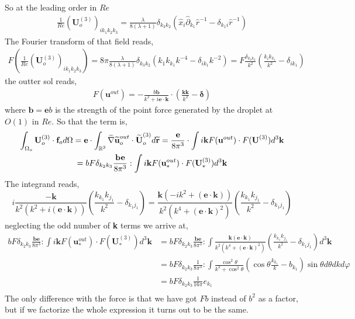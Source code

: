 So at the leading order in $Re$
\begin{align*}
    \frac{1}{Re}(\textbf{U}^{(3)}_o)_{ik_1k_2k_3}
    =
    \frac{\lambda}{8(\lambda+1)} \delta_{k_3 k_2 } ( \hat{x}_i\hat{\partial}_{k_1} \hat{r}^{-1}
    - \delta_{k_1 i} \hat{r}^{-1})
\end{align*}
The Fourier transform of that field reads,
\begin{align}
    F(\frac{1}{Re}(\textbf{U}^{(3)}_o)_{ik_1k_2k_3}) =
    8\pi \frac{\lambda}{8(\lambda+1)} \delta_{k_3 k_2 } (
        k_1 k_{k_1} k^{-4}
        - \delta_{i k_1} k^{-2}
    )
    =
    F\frac{\delta_{k_3k_2}}{k^2}\left(
        \frac{k_ik_{k_1}}{k^2}
        -\delta_{ik_1}
    \right)
\end{align}
the outter sol reads, 
\begin{align}
    F(\textbf{u}^{out})
    = 
    -\frac{b\textbf{b}}{k^2  + i \textbf{e}\cdot \textbf{k}}\cdot (\frac{\textbf{kk}}{k^2} - \bm\delta)
\end{align}
where $\textbf{b} = \textbf{e}b$ is the strength of the point force generated by the droplet at $O(1)$ in $Re$.
So that the term is,
\begin{multline}
    \intO[o]{\textbf{U}_{o}^{(3)}\cdot \textbf{f}_{o}}
    =
    \textbf{e}\cdot 
    \int_{\mathbb{R}^3}  \widetilde{\grad}  \widetilde{\textbf{u}}_{o}^{out}\cdot \widetilde{\textbf{U}}_{o}^{(3)} d\widetilde{\textbf{r}}
    =
    \frac{\textbf{e}}{8\pi^3}\cdot \int
    i \textbf{k} F(\textbf{u}^{out}) \cdot F(\textbf{U}^{(3)}) d^3 \textbf{k}\\
    =
    b F \delta_{k_2k_3}\frac{\textbf{be}}{8\pi^3} : \int
    i \textbf{k} F(\textbf{u}^{out}_*) \cdot F(\textbf{U}^{(3)}_*) d^3 \textbf{k}
\end{multline}
The integrand reads, 
\begin{equation*}
    i \frac{- \textbf{k}}{k^2(k^2  + i (\textbf{e}\cdot \textbf{k}))} (\frac{k_{k_1}k_{j_1}}{k^2} - \delta_{k_1j_1})   
    =
    \frac{ \textbf{k}(-ik^2  + (\textbf{e}\cdot \textbf{k}))}{k^2(k^4  + (\textbf{e}\cdot \textbf{k})^2)} (\frac{k_{k_1}k_{j_1}}{k^2} - \delta_{k_1j_1})   
\end{equation*}
neglecting the odd number of \textbf{k} terms we arrive at, 
\begin{align}
    b F \delta_{k_2k_3}\frac{\textbf{be}}{8\pi^3} : \int
    i \textbf{k} F(\textbf{u}^{out}_*) \cdot F(\textbf{U}^{(3)}_*) d^3 \textbf{k}
    &=
    b F \delta_{k_2k_3}\frac{\textbf{be}}{8\pi^3} : 
    \int
    \frac{ \textbf{k} (\textbf{e}\cdot \textbf{k})}{k^2(k^4  + (\textbf{e}\cdot \textbf{k})^2)} (\frac{k_{k_1}k_{j_1}}{k^2} - \delta_{k_1j_1})  d^3 \textbf{k}\\
    &=
    b F \delta_{k_2k_3}\frac{1}{8\pi^3} : 
    \int
    \frac{ \cos^2\theta }{k^2  +  \cos^2\theta} (\cos\theta\frac{k_{k_1}}{k} - b_{k_1})  \sin\theta d\theta dk d\varphi\\
    &=
    b F \delta_{k_2k_3}\frac{1}{16\pi} e_{k_1} 
    \\
\end{align}
The only difference with the force is that we have got $Fb$ instead of $b^2$ as a factor, but if we factorize the whole expression it turns out to be the same. 

